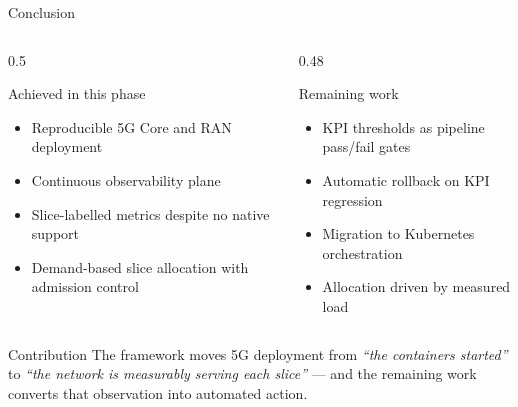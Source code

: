 \documentclass[aspectratio=169,11pt]{beamer}
\begin{document}
\begin{frame}{Conclusion}
  \begin{columns}[T,onlytextwidth]
    \begin{column}{0.5\textwidth}
      \begin{block}{Achieved in this phase}
        \small
        \begin{itemize}
          \item Reproducible 5G Core and RAN deployment
          \item Continuous observability plane
          \item Slice-labelled metrics despite no native support
          \item Demand-based slice allocation with admission control
        \end{itemize}
      \end{block}
    \end{column}
    \begin{column}{0.48\textwidth}
      \begin{block}{Remaining work}
        \small
        \begin{itemize}
          \item KPI thresholds as pipeline pass/fail gates
          \item Automatic rollback on KPI regression
          \item Migration to Kubernetes orchestration
          \item Allocation driven by measured load
        \end{itemize}
      \end{block}
    \end{column}
  \end{columns}
  \vfill
  \begin{block}{Contribution}
    \small
    The framework moves 5G deployment from \emph{“the containers started”} to
    \emph{“the network is measurably serving each slice”} --- and the remaining
    work converts that observation into automated action.
  \end{block}
\end{frame}
\end{document}
